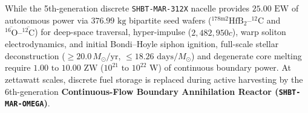 \documentclass[11pt,onecolumn]{article}
\begin{document}
\label{sec:mar_omega_reactor}

While the 5th-generation discrete \texttt{SHBT-MAR-312X} nacelle provides $25.00\text{ EW}$ of autonomous power via $376.99\text{ kg}$ bipartite seed wafers ($^{178\text{m2}}\text{Hf}\text{B}_2\text{--}^{12}\text{C}$ and $\overline{^{16}\text{O}}\text{--}\overline{^{12}\text{C}}$) for deep-space traversal, hyper-impulse ($2{,}482{,}950c$), warp soliton electrodynamics, and initial Bondi--Hoyle siphon ignition, full-scale stellar deconstruction ($\ge 20.0\,M_\odot/\text{yr}$, $\le 18.26\text{ days}/M_\odot$) and degenerate core melting require $1.00\text{ to }10.00\text{ ZW}$ ($10^{21}\text{ to }10^{22}\text{ W}$) of continuous boundary power. At zettawatt scales, discrete fuel storage is replaced during active harvesting by the 6th-generation \textbf{Continuous-Flow Boundary Annihilation Reactor (\texttt{SHBT-MAR-OMEGA})}.
\end{document}
